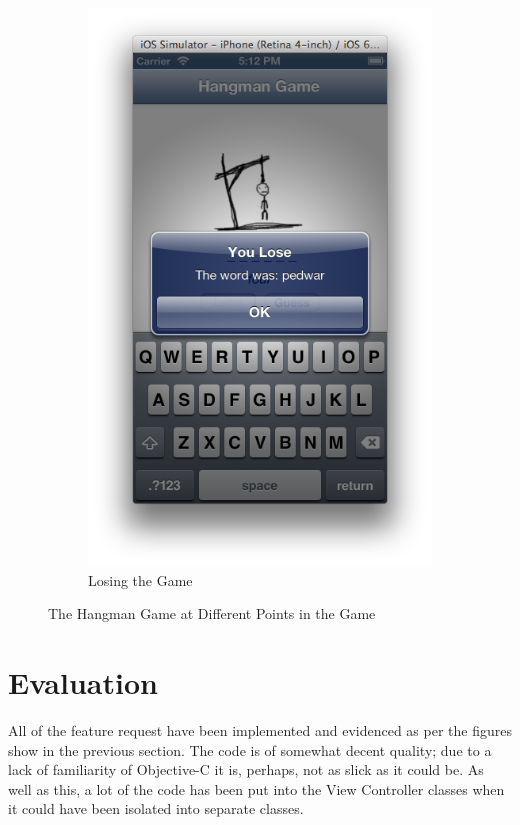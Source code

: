 \documentclass[11pt, a4paper]{article}
\begin{document}
\begin{figure}[h]
\begin{subfigure}[b]{0.3\textwidth}
\includegraphics[width=\textwidth]{img/hangman-lose}
\caption{Losing the Game}
\end{subfigure}
\caption{The Hangman Game at Different Points in the Game}
\label{fig:hangman-game}
\end{figure}

\section{Evaluation}

All of the feature request have been implemented and evidenced as per the figures show in the previous section. The code is of somewhat decent quality; due to a lack of familiarity of Objective-C it is, perhaps, not as slick as it could be. As well as this, a lot of the code has been put into the View Controller classes when it could have been isolated into separate classes.
\end{document}
